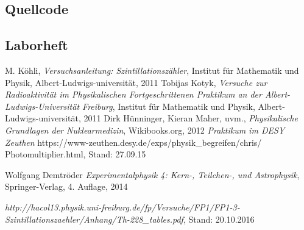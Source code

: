 \documentclass[12pt,listof=totoc]{scrartcl}
\begin{document}



%


\subsection{Quellcode}
\label{sourcecode}
%

\subsection{Laborheft}
\label{Laborbuch}
\newpage
\listoffigures


\newpage
\thispagestyle{empty}
\begin{thebibliography}{9}

	M. Köhli,
	\emph{Versuchsanleitung: Szintillationszähler},
	Institut für Mathematik und Physik,
	Albert-Ludwigs-universität,
	2011
	Tobijas Kotyk,
	\emph{Versuche zur Radioaktivität im Physikalischen Fortgeschrittenen Praktikum an der Albert-Ludwigs-Universität Freiburg},
	Institut für Mathematik und Physik,
	Albert-Ludwigs-universität,
	2011
	Dirk Hünninger, Kieran Maher, uvm.,
	\emph{Physikalische Grundlagen der Nuklearmedizin},
	Wikibooks.org,
	2012
	\emph{Praktikum im DESY Zeuthen}
	https://www-zeuthen.desy.de/exps/physik\_begreifen/chris/\\Photomultiplier.html,
	Stand: 27.09.15
	
Wolfgang Demtröder
 \emph{Experimentalphysik 4: Kern-, Teilchen-, und Astrophysik},
 Springer-Verlag,
 4. Auflage,
 2014
 
\emph{http://hacol13.physik.uni-freiburg.de/fp/Versuche/FP1/FP1-3-Szintillationszaehler/Anhang/Th-228\_tables.pdf}, Stand: 20.10.2016
 
\end{thebibliography}
\end{document}
